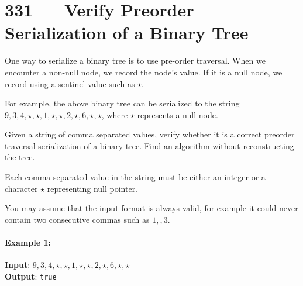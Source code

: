 \section{331 --- Verify Preorder Serialization of a Binary Tree}
One way to serialize a binary tree is to use pre-order traversal. When we encounter a non-null node, we record the node's value. If it is a null node, we record using a sentinel value such as $\star$.
\begin{figure}[H]
\end{figure}
For example, the above binary tree can be serialized to the string $9,3,4,\star,\star,1,\star,\star,2,\star,6,\star,\star$, where $\star$ represents a null node.
\par
Given a string of comma separated values, verify whether it is a correct preorder traversal serialization of a binary tree. Find an algorithm without reconstructing the tree.
\par
Each comma separated value in the string must be either an integer or a character $\star$ representing null pointer.
\par
You may assume that the input format is always valid, for example it could never contain two consecutive commas such as $1,,3$.

\paragraph{Example 1:}
\begin{flushleft}
\textbf{Input}: $9,3,4,\star,\star,1,\star,\star,2,\star,6,\star,\star$
\\
\textbf{Output}: \texttt{true}
\end{flushleft}

